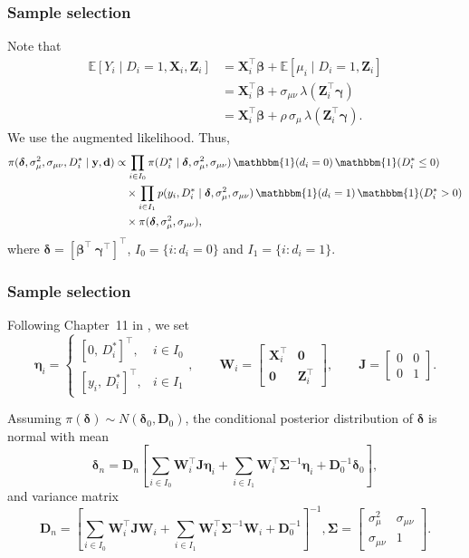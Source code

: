 \documentclass[12pt, compress]{beamer}
\begin{document}
\begin{frame}
	\frametitle{Sample selection}
Note that
\begin{align*}
	\mathbb E[Y_i\mid D_i=1,\mathbf X_i,\mathbf Z_i]
	&=\mathbf X_i^\top \boldsymbol\beta+\mathbb E[\mu_i\mid D_i=1,\mathbf Z_i]\\
	&=\mathbf X_i^\top \boldsymbol\beta + \sigma_{\mu\nu}\,\lambda(\mathbf Z_i^\top\boldsymbol\gamma)\\
	&=\mathbf X_i^\top \boldsymbol\beta + \rho\,\sigma_\mu\,\lambda(\mathbf Z_i^\top\boldsymbol\gamma).
\end{align*}
We use the augmented likelihood. Thus,
{\small
\begin{align*}
\pi(\boldsymbol{\delta},\sigma^2_{\mu},\sigma_{\mu\nu},D_i^*\mid \mathbf{y},\mathbf{d}) 
	& \propto \prod_{i\in I_{0}} \pi(D_i^*\mid \boldsymbol{\delta},\sigma^2_{\mu},\sigma_{\mu\nu}) 
	\, \mathbbm{1}(d_i=0)\, \mathbbm{1}(D_i^*\leq 0) \\
	& \quad \times \prod_{i\in I_{1}} p(y_i,D_i^*\mid \boldsymbol{\delta},\sigma^2_{\mu},\sigma_{\mu\nu}) 
	\, \mathbbm{1}(d_i=1)\, \mathbbm{1}(D_i^*> 0) \\
	& \quad \times \pi(\boldsymbol{\delta},\sigma^2_{\mu},\sigma_{\mu\nu}),
\end{align*}
}
where $\boldsymbol{\delta}=[\boldsymbol{\beta}^{\top} \ \boldsymbol{\gamma}^{\top}]^{\top}$, 
$I_0=\{i : d_i=0\}$ and $I_1=\{i : d_i=1\}$.
\end{frame}

\begin{frame}
	\frametitle{Sample selection}
Following Chapter~11 in \cite{greenberg2012introduction}, we set
\[
\boldsymbol{\eta}_i=
\begin{cases}
	[0, \, D_i^*]^{\top}, & i\in I_0\\
	[y_i, \, D_i^*]^{\top}, & i\in I_1
\end{cases},
\qquad
\mathbf{W}_i=\begin{bmatrix}
	\mathbf{X}_i^{\top} & \mathbf{0}\\
	\mathbf{0} & \mathbf{Z}_i^{\top}
\end{bmatrix}, 
\qquad
\mathbf{J}=\begin{bmatrix}
	0 & 0\\
	0 & 1
\end{bmatrix}.
\]

Assuming $\pi(\boldsymbol{\delta}) \sim N(\boldsymbol{\delta}_0,\mathbf{D}_0)$, the conditional posterior distribution of $\boldsymbol{\delta}$ is normal with mean
\[
\boldsymbol{\delta}_n=\mathbf{D}_n\left[\sum_{i\in I_0}\mathbf{W}_i^{\top}\mathbf{J}\boldsymbol{\eta}_i
+\sum_{i\in I_1}\mathbf{W}_i^{\top}\boldsymbol{\Sigma}^{-1}\boldsymbol{\eta}_i
+\mathbf{D}_0^{-1}\boldsymbol{\delta}_0\right],
\]
and variance matrix
\[
\mathbf{D}_n=\left[\sum_{i\in I_0}\mathbf{W}_i^{\top}\mathbf{J}\mathbf{W}_i
+\sum_{i\in I_1}\mathbf{W}_i^{\top}\boldsymbol{\Sigma}^{-1}\mathbf{W}_i
+\mathbf{D}_0^{-1}\right]^{-1}, \boldsymbol{\Sigma}=\begin{bmatrix}
	\sigma^2_{\mu} & \sigma_{\mu\nu} \\[6pt]
	\sigma_{\mu\nu} & 1
\end{bmatrix}.
\] 
\end{frame}
\end{document}

